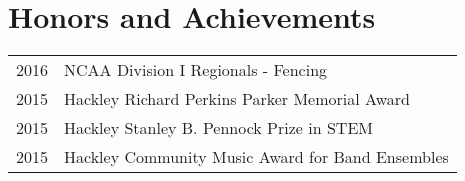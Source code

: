 \documentclass[letterpaper]{deedy-resume} %
\begin{document}
\begin{minipage}[t]{0.58\textwidth}
\section{Honors and Achievements} 

\begin{tabular}{rl}
2016	 & NCAA Division I Regionals - Fencing\\
2015	 & Hackley Richard Perkins Parker Memorial Award \\
2015	 & Hackley Stanley B. Pennock Prize in STEM\\
2015 	 & Hackley Community Music Award for Band Ensembles 
\end{tabular}







\end{minipage} %




\end{document}
